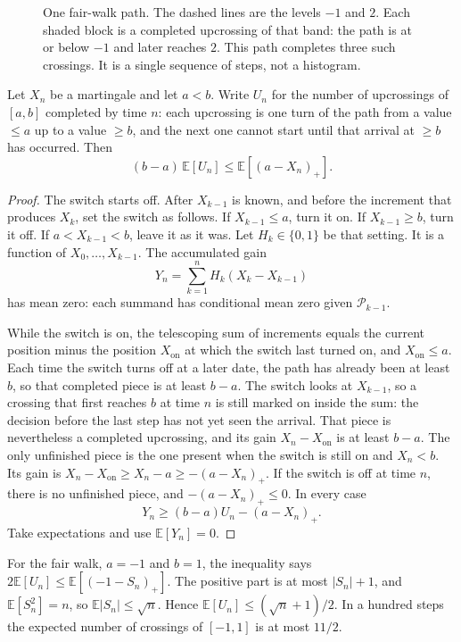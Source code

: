 \begin{figure}[ht]
\centering
{}
\caption{One fair-walk path. The dashed lines are the levels $-1$ and $2$. Each shaded block is a completed upcrossing of that band: the path is at or below $-1$ and later reaches $2$. This path completes three such crossings. It is a single sequence of steps, not a histogram.}
\label{fig:upcross}
\end{figure}

\begin{theorem}[upcrossings]\label{thm:upcross}
Let $X_n$ be a martingale and let $a<b$. Write $U_n$ for the number of upcrossings of $[a,b]$ completed by time $n$: each upcrossing is one turn of the path from a value $\le a$ up to a value $\ge b$, and the next one cannot start until that arrival at $\ge b$ has occurred. Then
\[
 (b-a)\,\mathbb E[U_n]\le\mathbb E[(a-X_n)_+].
\]
\end{theorem}
\begin{proof}
The switch starts off. After $X_{k-1}$ is known, and before the increment that produces $X_k$, set the switch as follows. If $X_{k-1}\le a$, turn it on. If $X_{k-1}\ge b$, turn it off. If $a<X_{k-1}<b$, leave it as it was. Let $H_k\in\{0,1\}$ be that setting. It is a function of $X_0,\ldots,X_{k-1}$. The accumulated gain
\[
 Y_n=\sum_{k=1}^n H_k(X_k-X_{k-1})
\]
has mean zero: each summand has conditional mean zero given $\mathcal P_{k-1}$.

While the switch is on, the telescoping sum of increments equals the current position minus the position $X_{\mathrm{on}}$ at which the switch last turned on, and $X_{\mathrm{on}}\le a$. Each time the switch turns off at a later date, the path has already been at least $b$, so that completed piece is at least $b-a$. The switch looks at $X_{k-1}$, so a crossing that first reaches $b$ at time $n$ is still marked on inside the sum: the decision before the last step has not yet seen the arrival. That piece is nevertheless a completed upcrossing, and its gain $X_n-X_{\mathrm{on}}$ is at least $b-a$. The only unfinished piece is the one present when the switch is still on and $X_n<b$. Its gain is $X_n-X_{\mathrm{on}}\ge X_n-a\ge-(a-X_n)_+$. If the switch is off at time $n$, there is no unfinished piece, and $-(a-X_n)_+\le0$. In every case
\[
 Y_n\ge (b-a)U_n-(a-X_n)_+.
\]
Take expectations and use $\mathbb E[Y_n]=0$.
\end{proof}

For the fair walk, $a=-1$ and $b=1$, the inequality says $2\mathbb E[U_n]\le\mathbb E[(-1-S_n)_+]$. The positive part is at most $|S_n|+1$, and $\mathbb E[S_n^2]=n$, so $\mathbb E|S_n|\le\sqrt n$. Hence $\mathbb E[U_n]\le(\sqrt n+1)/2$. In a hundred steps the expected number of crossings of $[-1,1]$ is at most $11/2$.

